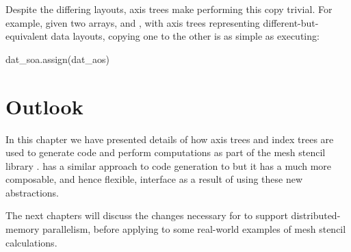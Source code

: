 \documentclass[thesis]{subfiles}
\begin{document}
Despite the differing layouts, axis trees make performing this copy trivial.
For example, given two arrays,  and , with axis trees representing different-but-equivalent data layouts, copying one to the other is as simple as executing:
\begin{pyinline}
  dat_soa.assign(dat_aos)
\end{pyinline}

\section{Outlook}

In this chapter we have presented details of how axis trees and index trees are used to generate code and perform computations as part of the mesh stencil library .
 has a similar approach to code generation to  but it has a much more composable, and hence flexible, interface as a result of using these new abstractions.

The next chapters will discuss the changes necessary for  to support distributed-memory parallelism, before applying  to some real-world examples of mesh stencil calculations.
\end{document}
